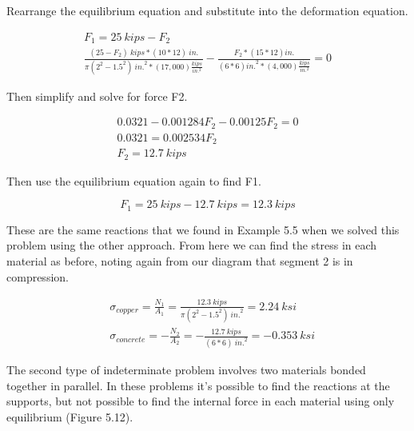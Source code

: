 \documentclass[
  letterpaper,
  DIV=11,
  numbers=noendperiod]{scrreprt}
\begin{document}
\begin{tcolorbox}
\begin{tcolorbox}
Rearrange the equilibrium equation and substitute into the deformation
equation.

\[
\begin{gathered}
F_1=25{~kips}-F_2 \\
\frac{(25-F_2){~kips} *(10 * 12){~in.}}{\pi(2^2-1.5^2){~in.}^2 *(17,000)\frac{kips}{in.^2}}-\frac{F_2 *(15 * 12){in.}}{(6 * 6){in.}^2 *(4,000)\frac{kips}{in.^2}}=0
\end{gathered}
\]

Then simplify and solve for force F2.

\[
\begin{gathered}
0.0321-0.001284 F_2-0.00125 F_2=0 \\
0.0321=0.002534 F_2 \\
F_2=12.7 {~kips}
\end{gathered}
\]

Then use the equilibrium equation again to find F1.

\[
F_1=25{~kips}-12.7{~kips}=12.3{~kips}
\]

These are the same reactions that we found in Example 5.5 when we solved
this problem using the other approach. From here we can find the stress
in each material as before, noting again from our diagram that segment 2
is in compression.

\[
\begin{aligned}
& \sigma_{copper}=\frac{N_1}{A_1}=\frac{12.3{~kips}}{\pi(2^2-1.5^2){~in.}^2}=2.24 {~ksi} \\
& \sigma_{concrete}=-\frac{N_2}{A_2}=-\frac{12.7{~kips}}{(6 * 6){~in.}^2}=-0.353 {~ksi}
\end{aligned}
\]

\end{tcolorbox}

\end{tcolorbox}

The second type of indeterminate problem involves two materials bonded
together in parallel. In these problems it's possible to find the
reactions at the supports, but not possible to find the internal force
in each material using only equilibrium (Figure 5.12).
\end{document}
